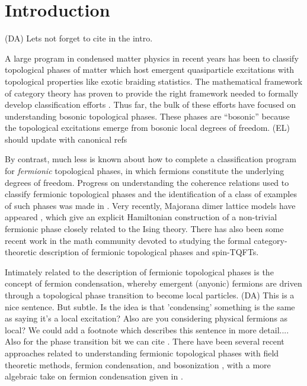 \documentclass[12pt,a4paper]{article}
\newcommand{\dave}[1]{{\color{ao(english)}\footnotesize{(DA) #1}}}
\newcommand{\ethan}[1]{{\color{amethyst}\footnotesize{(EL) #1}}}
\begin{document}
\section{Introduction}

\dave{Lets not forget to cite \cite{Walker2014,Walker2015} in the intro.}

A large program in condensed matter physics in recent years has been to classify 
topological phases of matter which host emergent quasiparticle excitations 
with topological properties like exotic braiding statistics. 
The mathematical framework of category theory has proven to provide the right 
framework needed to formally develop classification efforts \cite{kitaev2006}. 
Thus far, the bulk of these efforts have focused on understanding bosonic topological phases.
These phases are ``bosonic'' because the topological excitations emerge from bosonic 
local degrees of freedom. \ethan{should update with canonical refs}

By contrast, much less is known about how to complete a classification program for {\it fermionic} topological phases, in which fermions constitute 
the underlying degrees of freedom. 
Progress on understanding the coherence relations used to classify fermionic topological phases and the identification of a class of examples of such phases was made in \cite{gu2015,gu2014,Lan2016b}. 
Very recently, Majorana dimer lattice models have appeared \cite{ware2016,tarantino2016}, 
which give an explicit Hamiltonian construction of a 
non-trivial
fermionic phase closely related to the Ising theory. 
There has also been some recent work in the math community \cite{usher2016,brundan2016,bruillard2017,bonderson2017} 
devoted to studying the formal category-theoretic description of fermionic topological phases and spin-TQFTs. 

Intimately related to the description of fermionic topological phases is the concept of fermion condensation, 
whereby emergent (anyonic) fermions are driven through a topological phase transition to become 
local particles. 
\dave{This is a nice sentence. But subtle. 
Is the idea is that 'condensing' something is the same as saying it's a local excitation?
Also are you considering physical fermions as local?
We could add a footnote which describes this sentence in more detail....
Also for the phase transition bit we can cite \cite{Bais2009}.}
There have been several recent approaches related to understanding 
fermionic topological phases with field theoretic methods, fermion condensation, and bosonization \cite{gaiotto2016, bhardwaj2016, bhardwaj2016b,kapustin2017,putrov2016}, 
with a more algebraic take on fermion condensation given in \cite{wan2016}. 
\end{document}
